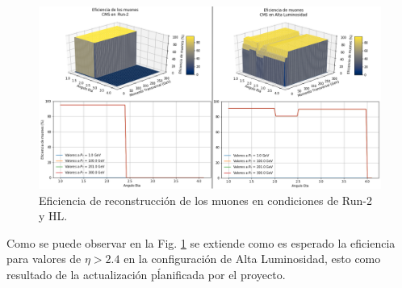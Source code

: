 \begin{figure}[!h]
\centering
\includegraphics[width=1\textwidth]{Analisis_y_Resultados/imagenes/Eficiencia_of_Muon.png}
\caption{Eficiencia de reconstrucción de los muones en condiciones de Run-2 y HL.}
\label{Compara_eficiencia_muon}
\end{figure}

Como se puede observar en la Fig. \ref{Compara_eficiencia_muon} se extiende como es esperado la eficiencia para valores de $\eta > 2.4$ en la configuración de Alta Luminosidad, esto como resultado de la actualización pĺanificada por el proyecto.






